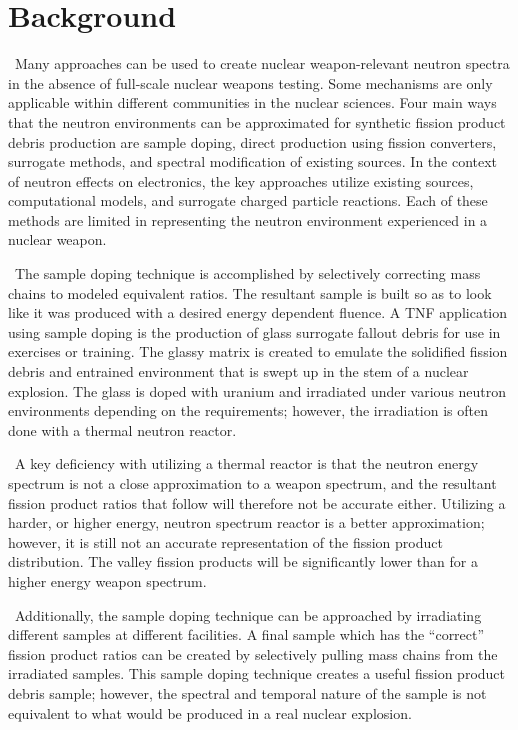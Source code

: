 \section{Background}

\ Many approaches can be used to create nuclear weapon-relevant neutron spectra in the absence of full-scale nuclear weapons testing. Some mechanisms are only applicable within different communities in the nuclear sciences. Four main ways that the neutron environments can be approximated for synthetic fission product debris production are sample doping, direct production using fission converters, surrogate methods, and spectral modification of existing sources\cite{Bevins}. In the context of neutron effects on electronics, the key approaches utilize existing sources, computational models, and surrogate charged particle reactions\cite{Bevins, Bouchard}. Each of these methods are limited in representing the neutron environment experienced in a nuclear weapon. 

\ The sample doping technique is accomplished by selectively correcting mass chains to modeled equivalent ratios. The resultant sample is built so as to look like it was produced with a desired energy dependent fluence. 
A TNF application using sample doping is the production of glass surrogate fallout debris for use in exercises or training\cite{Carney2014b}. 
The glassy matrix is created to emulate the solidified fission debris and entrained environment that is swept up in the stem of a nuclear explosion. 
The glass is doped with uranium and irradiated under various neutron environments depending on the requirements; however, the irradiation is often done with a thermal neutron reactor. 

\ A key deficiency with utilizing a thermal reactor is that the neutron energy spectrum is not a close approximation to a weapon spectrum, and the resultant fission product ratios that follow will therefore not be accurate either. Utilizing a harder, or higher energy, neutron spectrum reactor is a better approximation; however, it is still not an accurate representation of the fission product distribution. The valley fission products will be significantly lower than for a higher energy weapon spectrum.

\ Additionally, the sample doping technique can be approached by irradiating different samples at different facilities. A final sample which has the ``correct'' fission product ratios can be created by selectively pulling mass chains from  the irradiated samples. 
This sample doping technique creates a useful fission product debris sample; however, the spectral and temporal nature of the sample is not equivalent to what would be produced in a real nuclear explosion. 

